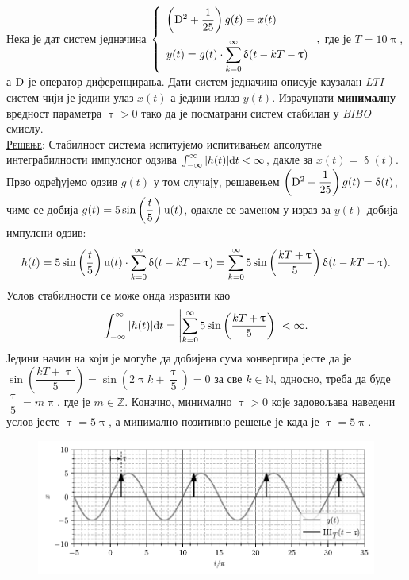 \PID 
Нека је  
дат систем једначина
$
\displaystyle
\left\lbrace
\begin{array}{l}
\left({\rm D}^2 + \dfrac{1}{25} \right) g(t) = x(t) 
\\[4mm] \displaystyle
y(t) = g(t) \cdot \sum_{k=0}^{\infty} \updelta(t - kT - \uptau)
\end{array} 
\right.,$
где је $T = 10\uppi$, а ${\rm D}$ је оператор 
диференцирања. Дати систем једначина описује
каузалан \textit{LTI} систем чији је једини улаз 
$x(t)$ а једини излаз $y(t)$.
Израчунати \textbf{минималну} вредност параметра $\uptau > 0$ тако да је посматрани систем
стабилан у \textit{BIBO} смислу.
\\[2mm]

\textsc{\underline{Решење}}: Стабилност система испитујемо испитивањем апсолутне интеграбилности импулсног одзива
$\int_{-\infty}^{\infty} |h(t)| {\rm d} t < \infty$, дакле за $x(t) = \updelta(t)$. Прво одређујемо одзив $g(t)$ у том случају,
решавењем $\left({\rm D}^2 + \dfrac{1}{25} \right) g(t) = \updelta(t)$, чиме се добија 
$g(t) =  5 \sin\left(\dfrac{t}{5}\right) {\rm u}(t)$, одакле се заменом у израз за $y(t)$ добија импулсни одзив: 
\begin{equation}
    h(t) = 5 \sin\left(\dfrac{t}{5}\right) \uu(t) \cdot \sum_{k=0}^{\infty} \updelta(t - kT - \uptau) 
         = \sum_{k=0}^{\infty}  5 \sin\left(\dfrac{kT + \uptau}{5}\right) \updelta(t - kT - \uptau). \label{eq:\ID.h}
\end{equation}
Услов стабилности се може онда изразити као
\begin{equation}
    \int_{-\infty}^{\infty} |h(t)| {\rm d} t = \left| \sum_{k=0}^{\infty}  5 \sin\left(\dfrac{kT + \uptau}{5}\right)\right| < \infty.  
\end{equation}
Једини начин на који је могуће да добијена сума конвергира јесте да је
$\sin\left(\dfrac{kT + \uptau}{5}\right) =  \sin\left(2\uppi k + \dfrac{\uptau}{5}\right) = 0$ за све $k \in \mathbb{N}$,
односно, треба да буде $\dfrac{\uptau}{5} = m\uppi$, где је $m \in \mathbb{Z}$. Коначно, минимално $\uptau>0$ које задовољава наведени
услов јесте $\uptau = 5\uppi$, а минимално позитивно решење је када је $\uptau = 5\uppi$.


\begin{figure}[!b]
    \centering
    \includegraphics{fig/delta_odabiranje_sin_edit.pdf }
    \caption{}
    \label{fig:\ID.ideja}
\end{figure}

